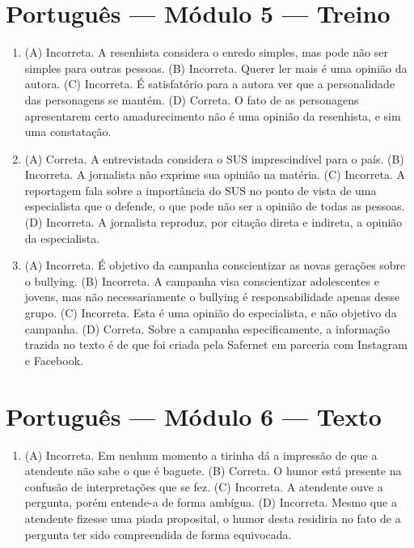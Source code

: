 \section*{Português — Módulo 5 — Treino}

\begin{enumerate}
\item (A) Incorreta. A resenhista considera o enredo simples, mas pode não ser
simples para outras pessoas.
(B) Incorreta. Querer ler mais é uma opinião da autora.
(C) Incorreta. É satisfatório para a autora ver que a personalidade das
personagens se mantém.
(D) Correta. O fato de as personagens apresentarem certo amadurecimento
não é uma opinião da resenhista, e sim uma constatação.

\item (A) Correta. A entrevistada considera o SUS imprescindível para o país.
(B) Incorreta. A jornalista não exprime sua opinião na matéria.
(C) Incorreta. A reportagem fala sobre a importância do SUS no ponto de
vista de uma especialista que o defende, o que pode não ser a opinião de
todas as pessoas.
(D) Incorreta. A jornalista reproduz, por citação direta e indireta, a
opinião da especialista.

\item (A) Incorreta. É objetivo da campanha conscientizar as novas gerações
sobre o bullying.
(B) Incorreta. A campanha visa conscientizar adolescentes e jovens, mas
não necessariamente o bullying é responsabilidade apenas desse grupo.
(C) Incorreta. Esta é uma opinião do especialista, e não objetivo da
campanha.
(D) Correta. Sobre a campanha especificamente, a informação trazida no
texto é de que foi criada pela Safernet em parceria com Instagram e
Facebook.
\end{enumerate}

\section*{Português — Módulo 6 — Texto}

\begin{enumerate}
\item (A) Incorreta. Em nenhum momento a tirinha dá a impressão de que a
atendente não sabe o que é baguete.
(B) Correta. O humor está presente na confusão de interpretações que se fez.
(C) Incorreta. A atendente ouve a pergunta, porém entende-a de forma
ambígua.
(D) Incorreta. Mesmo que a atendente fizesse uma piada proposital, o
humor desta residiria no fato de a pergunta ter sido compreendida de forma equivocada.
\end{enumerate}

